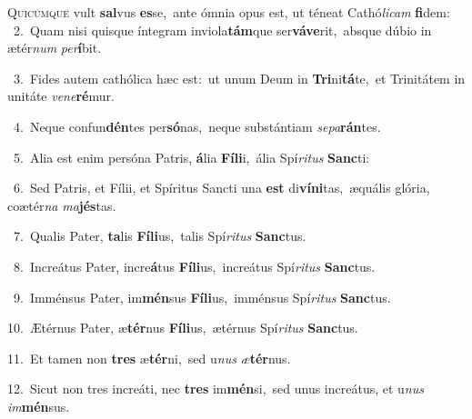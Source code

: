 \lettrine{\initial\textcolor{\initialcolor}{Q}}{uicúmque} vult \textbf{sal}\-vus \textbf{es}\-se,~\star ante ómnia opus est, ut téneat Cathó\-\textit{li}\-\textit{cam} \textbf{fi}\-dem:\\
{\numbfont\textcolor{\numbcolor}{~2.}}~Quam nisi quisque íntegram inviola\-\textbf{tám}\-que ser\-\textbf{vá}\-\textbf{ve}rit,~\star absque dúbio in ætér\textit{num} \textit{per}\-\textbf{í}bit.\par
{\numbfont\textcolor{\numbcolor}{~3.}}~Fides autem cathólica hæc est:~\dagger ut unum Deum in \textbf{Tri}\-ni\-\textbf{tá}\-te,~\star et Trinitátem in unitáte \textit{ve}\-\textit{ne}\textbf{ré}mur.\par
{\numbfont\textcolor{\numbcolor}{~4.}}~Neque confun\-\textbf{dén}\-tes per\-\textbf{só}\-nas,~\star neque substántiam \textit{se}\-\textit{pa}\textbf{rán}tes.\par
{\numbfont\textcolor{\numbcolor}{~5.}}~Alia est enim persóna Patris, \textbf{á}\-lia \textbf{Fí}\-\textbf{li}i,~\star ália Spí\-\textit{ri}\-\textit{tus} \textbf{Sanc}\-ti:\par
{\numbfont\textcolor{\numbcolor}{~6.}}~Sed Patris, et Fílii, et Spíritus Sancti una \textbf{est} di\-\textbf{ví}\-\textbf{ni}tas,~\star æquális glória, coætér\textit{na} \textit{ma}\-\textbf{jés}tas.\par
{\numbfont\textcolor{\numbcolor}{~7.}}~Qualis Pater, \textbf{ta}\-lis \textbf{Fí}\-\textbf{li}us,~\star talis Spí\-\textit{ri}\-\textit{tus} \textbf{Sanc}\-tus.\par
{\numbfont\textcolor{\numbcolor}{~8.}}~Increátus Pater, incre\-\textbf{á}\-tus \textbf{Fí}\-\textbf{li}us,~\star increátus Spí\-\textit{ri}\-\textit{tus} \textbf{Sanc}\-tus.\par
{\numbfont\textcolor{\numbcolor}{~9.}}~Imménsus Pater, im\-\textbf{mén}\-sus \textbf{Fí}\-\textbf{li}us,~\star imménsus Spí\-\textit{ri}\-\textit{tus} \textbf{Sanc}\-tus.\par
{\numbfont\textcolor{\numbcolor}{10.}}~Ætérnus Pater, æ\-\textbf{tér}\-nus \textbf{Fí}\-\textbf{li}us,~\star ætérnus Spí\-\textit{ri}\-\textit{tus} \textbf{Sanc}\-tus.\par
{\numbfont\textcolor{\numbcolor}{11.}}~Et tamen non \textbf{tres} æ\-\textbf{tér}\-ni,~\star sed u\textit{nus} \textit{æ}\-\textbf{tér}nus.\par
{\numbfont\textcolor{\numbcolor}{12.}}~Sicut non tres increáti, nec \textbf{tres} im\-\textbf{mén}\-si,~\star sed unus increátus, et u\textit{nus} \textit{im}\-\textbf{mén}sus.\par
